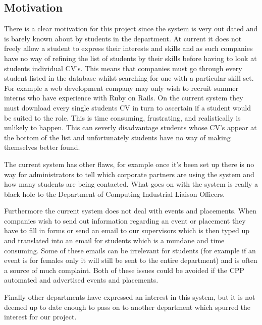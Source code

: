 \subsection{Motivation}
  There is a clear motivation for this project since the system is very out dated and is barely known about by students in the department.
  At current it does not freely allow a student to express their interests and skills and as such companies have no way of refining the list of students by their skills before having to look at students individual CV's. This means that companies must go through every student listed in the database whilst searching for one with a particular skill set. For example a web development company may only wish to recruit summer interns who have experience with Ruby on Rails. On the current system they must download every single students CV in turn to ascertain if a student would be suited to the role. This is time consuming, frustrating, and realistically is unlikely to happen.
  This can severly disadvantage students whose CV's appear at the bottom of the list and unfortunately students have
  no way of making themselves better found.

  The current system has other flaws, for example once it's been set up there is no way for administrators to tell which corporate partners are using the system and how many students are being contacted. What goes on with the system is really a black hole to the Department of Computing Industrial Liaison Officers. 

  Furthermore the current system does not deal with events and placements. When companies wish to send out information regarding an event or placement they have to fill in forms or send an email to our supervisors which is then typed up and translated into an email for students which is a mundane and time consuming. Some of these emails can be irrelevant for students (for example if an event is for females only it will still be sent to the entire department) and is often a source of much complaint. 
  Both of these issues could be avoided if the CPP automated and advertised events and placements.

  Finally other departments have expressed an interest in this system, but it is not deemed up to date enough to pass on to another department which spurred the interest for our project.